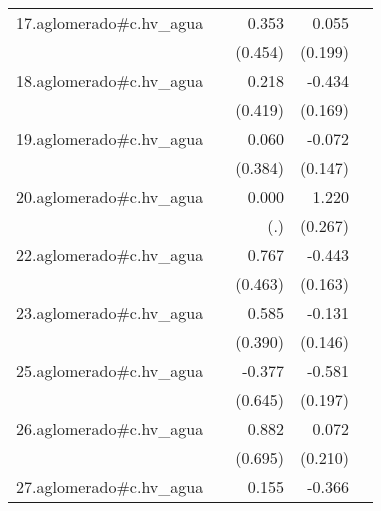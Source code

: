 {\begin{longtable}{l*{4}{D{.}{.}{-1}}}
\addlinespace
17.aglomerado#c.hv\_agua&                     &       0.353         &       0.055         &                     \\
            &                     &     (0.454)         &     (0.199)         &                     \\
\addlinespace
18.aglomerado#c.hv\_agua&                     &       0.218         &      -0.434\sym{*}  &                     \\
            &                     &     (0.419)         &     (0.169)         &                     \\
\addlinespace
19.aglomerado#c.hv\_agua&                     &       0.060         &      -0.072         &                     \\
            &                     &     (0.384)         &     (0.147)         &                     \\
\addlinespace
20.aglomerado#c.hv\_agua&                     &       0.000         &       1.220\sym{***}&                     \\
            &                     &         (.)         &     (0.267)         &                     \\
\addlinespace
22.aglomerado#c.hv\_agua&                     &       0.767         &      -0.443\sym{**} &                     \\
            &                     &     (0.463)         &     (0.163)         &                     \\
\addlinespace
23.aglomerado#c.hv\_agua&                     &       0.585         &      -0.131         &                     \\
            &                     &     (0.390)         &     (0.146)         &                     \\
\addlinespace
25.aglomerado#c.hv\_agua&                     &      -0.377         &      -0.581\sym{**} &                     \\
            &                     &     (0.645)         &     (0.197)         &                     \\
\addlinespace
26.aglomerado#c.hv\_agua&                     &       0.882         &       0.072         &                     \\
            &                     &     (0.695)         &     (0.210)         &                     \\
\addlinespace
27.aglomerado#c.hv\_agua&                     &       0.155         &      -0.366         &                     \\

\end{longtable}}
